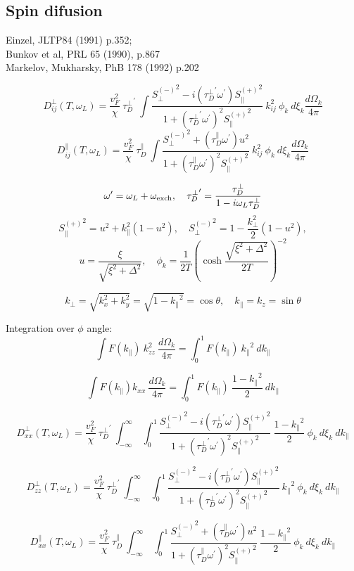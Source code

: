 \documentclass[a4paper]{article}
\begin{document}
\subsection*{Spin difusion}

\def\tdp{\tau_D^\perp}
\def\tdpa{\tau_D^\parallel}
\def\ol{\omega_L}
\def\oe{\omega_{\rm exch}}
\def\op{\omega^\prime}
\def\tp{{\tdp}^\prime}
\def\t{\tdpa}

\def\sm{{S_\perp^{(-)}}^2}
\def\sp{{S_\parallel^{(+)}}^2}

\def\kpe{{k_\perp}}
\def\kpa{{k_\parallel}}

\def\smx{{S_{xx}^{(-)}}^2}
\def\spz{{S_{zz}^{(+)}}^2}


Einzel, JLTP84 (1991) p.352;\\
Bunkov et al, PRL 65 (1990), p.867\\
Markelov, Mukharsky, PhB 178 (1992) p.202

$$
D^\perp_{ij}(T, \ol) =
  \frac{v_F^2}{\chi}\ \tp
  \  \int \frac{\sm - i(\tp\op)\sp}{1+(\tp\op)^2\sp}
  \  k_{ij}^2\ \phi_k\ d\xi_k\frac{d\Omega_k}{4\pi}
$$
$$
D^\parallel_{ij}(T, \ol) =
  \frac{v_F^2}{\chi}\ \t
  \  \int \frac{\sm + (\t\op)u^2 }{1+(\t\op)^2\sp}
  \  k_{ij}^2\ \phi_k\ d\xi_k\frac{d\Omega_k}{4\pi}
$$

$$
\op = \ol+\oe,\quad
\tp = \frac{\tdp}{1-i\ol\tdp}
$$
$$
\sp = u^2 + k_\parallel^2(1-u^2),\quad
\sm = 1-\frac{k_\perp^2}{2}(1-u^2),
$$
$$
u=\frac{\xi}{\sqrt{\xi^2+\Delta^2}}, \quad
\phi_k = \frac{1}{2T}\left(\cosh\frac{\sqrt{\xi^2+\Delta^2}}{2T}\right)^{-2}
$$

$$
k_\perp = \sqrt{k_x^2+k_y^2} = \sqrt{1-\kpa^2} = \cos\theta, \quad
k_\parallel = k_z = \sin\theta
$$

Integration over $\phi$ angle:
$$
\int F(\kpa)\ k_{zz}^2\ \frac{d\Omega_k}{4\pi} =
\int_0^1 F(\kpa)\ \kpa^2\ d\kpa
$$

$$
\int F(\kpa) k_{xx}\ \frac{d\Omega_k}{4\pi} =
\int_0^1 F(\kpa)\ \frac{1-\kpa^2}{2}\ d\kpa
$$


$$
D^\perp_{xx}(T, \ol) =
  \frac{v_F^2}{\chi}\ \tp
  \ \int_{-\infty}^{\infty}\ \int_{0}^{1}
  \frac{\sm - i(\tp\op)\sp}{1+(\tp\op)^2\sp}
  \ \frac{1-\kpa^2}{2}\ \phi_k\ d\xi_k\ d\kpa
$$

$$
D^\perp_{zz}(T, \ol) =
  \frac{v_F^2}{\chi}\ \tp
  \ \int_{-\infty}^{\infty}\ \int_{0}^{1}
  \frac{\sm - i(\tp\op)\sp}{1+(\tp\op)^2\sp}
  \ \kpa^2\ \phi_k\ d\xi_k\ d\kpa
$$

$$
D^\parallel_{xx}(T, \ol) =
  \frac{v_F^2}{\chi}\ \t
  \ \int_{-\infty}^{\infty}\ \int_{0}^{1}
  \frac{\sm + (\t\op)u^2 }{1+(\t\op)^2\sp}
  \  \frac{1-\kpa^2}{2}\ \phi_k\ d\xi_k\ d\kpa
$$
\end{document}
